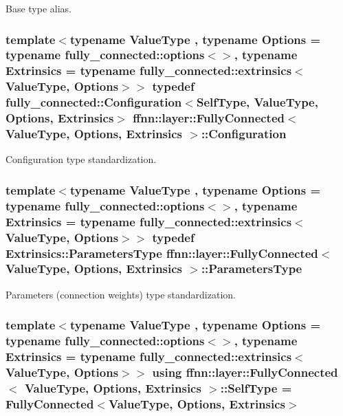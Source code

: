 Base type alias. 

\hypertarget{classffnn_1_1layer_1_1_fully_connected_a0f17b9785828b21e00a8fe84fd173406}{
\subsubsection[{Configuration}]{\setlength{\rightskip}{0pt plus 5cm}template$<$typename Value\-Type , typename Options  = typename fully\-\_\-connected\-::options$<$$>$, typename Extrinsics  = typename fully\-\_\-connected\-::extrinsics$<$\-Value\-Type, Options$>$$>$ typedef {\bf fully\-\_\-connected\-::\-Configuration}$<${\bf Self\-Type}, Value\-Type, Options, Extrinsics$>$ {\bf ffnn\-::layer\-::\-Fully\-Connected}$<$ Value\-Type, Options, Extrinsics $>$\-::{\bf Configuration}}}\label{classffnn_1_1layer_1_1_fully_connected_a0f17b9785828b21e00a8fe84fd173406}


Configuration type standardization. 

\hypertarget{classffnn_1_1layer_1_1_fully_connected_aab9cb25e10620b406a13414ac81747fa}{
\subsubsection[{Parameters\-Type}]{\setlength{\rightskip}{0pt plus 5cm}template$<$typename Value\-Type , typename Options  = typename fully\-\_\-connected\-::options$<$$>$, typename Extrinsics  = typename fully\-\_\-connected\-::extrinsics$<$\-Value\-Type, Options$>$$>$ typedef Extrinsics\-::\-Parameters\-Type {\bf ffnn\-::layer\-::\-Fully\-Connected}$<$ Value\-Type, Options, Extrinsics $>$\-::{\bf Parameters\-Type}}}\label{classffnn_1_1layer_1_1_fully_connected_aab9cb25e10620b406a13414ac81747fa}


Parameters (connection weights) type standardization. 

\hypertarget{classffnn_1_1layer_1_1_fully_connected_a886c7ef9b12d8835f0acb231f446e8cf}{
\subsubsection[{Self\-Type}]{\setlength{\rightskip}{0pt plus 5cm}template$<$typename Value\-Type , typename Options  = typename fully\-\_\-connected\-::options$<$$>$, typename Extrinsics  = typename fully\-\_\-connected\-::extrinsics$<$\-Value\-Type, Options$>$$>$ using {\bf ffnn\-::layer\-::\-Fully\-Connected}$<$ Value\-Type, Options, Extrinsics $>$\-::{\bf Self\-Type} =  {\bf Fully\-Connected}$<$Value\-Type, Options, Extrinsics$>$}}\label{classffnn_1_1layer_1_1_fully_connected_a886c7ef9b12d8835f0acb231f446e8cf}



